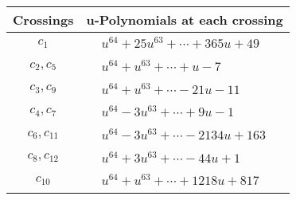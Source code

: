 \documentclass[1p]{elsarticle_modified}
\theoremstyle{definition}
\begin{document}
\begin{tabular}{m{50pt}|m{274pt}}
Crossings & \hspace{64pt}u-Polynomials at each crossing \\
\hline $$\begin{aligned}c_{1}\end{aligned}$$&$\begin{aligned}
&u^{64}+25 u^{63}+\cdots+365 u+49
\end{aligned}$\\
\hline $$\begin{aligned}c_{2},c_{5}\end{aligned}$$&$\begin{aligned}
&u^{64}+u^{63}+\cdots+u-7
\end{aligned}$\\
\hline $$\begin{aligned}c_{3},c_{9}\end{aligned}$$&$\begin{aligned}
&u^{64}+u^{63}+\cdots-21 u-11
\end{aligned}$\\
\hline $$\begin{aligned}c_{4},c_{7}\end{aligned}$$&$\begin{aligned}
&u^{64}-3 u^{63}+\cdots+9 u-1
\end{aligned}$\\
\hline $$\begin{aligned}c_{6},c_{11}\end{aligned}$$&$\begin{aligned}
&u^{64}-3 u^{63}+\cdots-2134 u+163
\end{aligned}$\\
\hline $$\begin{aligned}c_{8},c_{12}\end{aligned}$$&$\begin{aligned}
&u^{64}+3 u^{63}+\cdots-44 u+1
\end{aligned}$\\
\hline $$\begin{aligned}c_{10}\end{aligned}$$&$\begin{aligned}
&u^{64}+u^{63}+\cdots+1218 u+817
\end{aligned}$\\
\hline
\end{tabular}\\~\\
\newpage\renewcommand{\arraystretch}{1}
\end{document}
